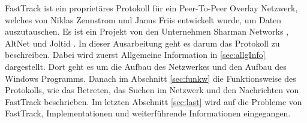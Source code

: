 FastTrack ist ein proprietäres Protokoll für ein Peer-To-Peer Overlay Netzwerk, welches von Niklas Zennstrom und Janus Friis entwickelt wurde, um Daten auszutauschen. \cite{liang2006fasttrack}
Es ist ein Projekt von den Unternehmen Sharman Networks \cite{sharmanN}, AltNet \cite{fastTrack} und Joltid \cite{joltid}.
In dieser Ausarbeitung geht es darum das Protokoll zu beschreiben.
Dabei wird zuerst Allgemeine Information in \ref{sec:allgInfo} dargestellt.
Dort geht es um die Aufbau des Netzwerkes und den Aufbau des Windows Programms.
Danach im Abschnitt \ref{sec:funkw} die Funktionsweise des Protokolls, wie das Betreten, das Suchen im Netzwerk und den Nachrichten von FastTrack beschrieben.
Im letzten Abschnitt \ref{sec:last} wird auf die Probleme von FastTrack, Implementationen und weiterführende Informationen eingegangen. 